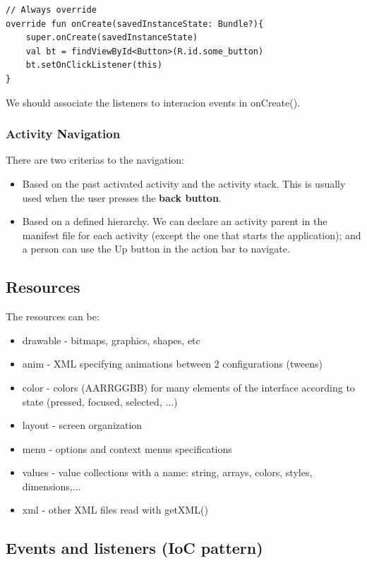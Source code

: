 \begin{lstlisting}
// Always override
override fun onCreate(savedInstanceState: Bundle?){
    super.onCreate(savedInstanceState)
    val bt = findViewById<Button>(R.id.some_button)
    bt.setOnClickListener(this)
}
\end{lstlisting}

We should associate the listeners to interacion events in onCreate().


\subsubsection{Activity Navigation}
There are two criterias to the navigation:
\begin{itemize}
    \item Based on the past activated activity and the activity stack. This is usually 
    used when the user presses the \textbf{back button}.
    \item Based on a defined hierarchy. We can declare an activity parent in the manifest file 
    for each activity (except the one that starts the application); and a person can use the Up 
    button in the action bar to navigate.
\end{itemize}

\subsection{Resources}
The resources can be:
\begin{itemize}
    \item drawable - bitmaps, graphics, shapes, etc 
    \item anim - XML specifying animations between 2 configurations (tweens)
    \item color - colors (AARRGGBB) for many elements of the interface according to 
    state (pressed, focused, selected, ...)
    \item layout - screen organization 
    \item menu - options and context menus specifications 
    \item values - value collections with a name: string, arrays, colors, styles, dimensions,...
    \item xml - other XML files read with getXML()
\end{itemize}

\subsection{Events and listeners (IoC pattern)}

